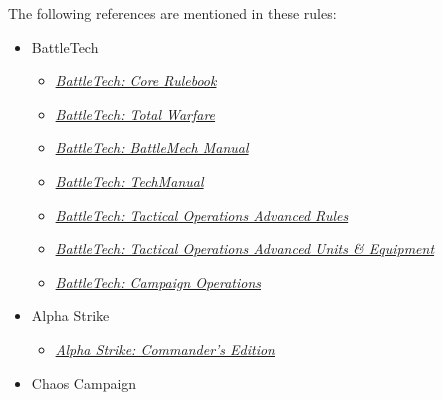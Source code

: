 The following references are mentioned in these rules:

\begin{itemize}

  \item BattleTech

  \begin{itemize}

    \item \emph{\href{https://store.catalystgamelabs.com/products/battletech-core-rulebook}{BattleTech: Core Rulebook}}

    \item \emph{\href{https://store.catalystgamelabs.com/products/battletech-total-warfare-pdf}{BattleTech: Total Warfare}}

    \item \emph{\href{https://store.catalystgamelabs.com/products/battletech-battlemech-manual-book-pdf-combo}{BattleTech: BattleMech Manual}}

    \item \emph{\href{https://store.catalystgamelabs.com/products/battletech-techmanual-book-pdf}{BattleTech: TechManual}}

    \item \emph{\href{https://store.catalystgamelabs.com/products/battletech-tactical-operations-advanced-rules}{BattleTech: Tactical Operations Advanced Rules}}

    \item \emph{\href{https://store.catalystgamelabs.com/products/battletech-tactical-operations-advanced-units-equipement}{BattleTech: Tactical Operations Advanced Units \& Equipment}}

    \item \emph{\href{https://store.catalystgamelabs.com/products/battletech-campaign-operations-pdf}{BattleTech: Campaign Operations}}

  \end{itemize}

  \item Alpha Strike

  \begin{itemize}

    \item \emph{\href{https://store.catalystgamelabs.com/products/battletech-alpha-strike-commanders-edition}{Alpha Strike: Commander's Edition}}

  \end{itemize}

  \item Chaos Campaign


\end{itemize}
